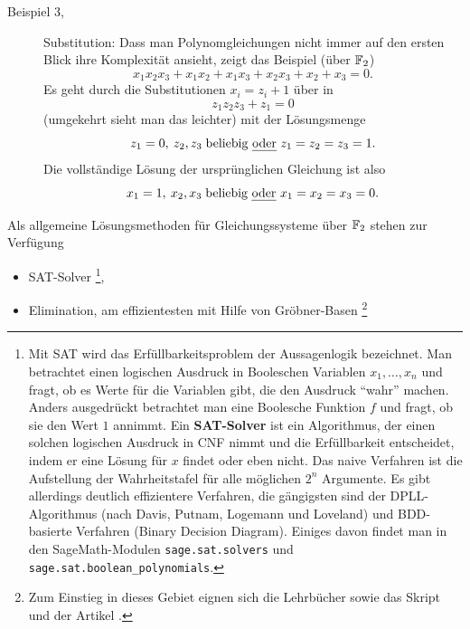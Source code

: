 \begin{refsegment}
\begin{description}
\item[Beispiel 3,] Substitution: Dass man
   Polynomgleichungen nicht immer auf den ersten
   Blick ihre Komplexität ansieht, zeigt das Beispiel (über $\mathbb{F}_2$)
\[
    x_1x_2x_3 + x_1x_2 + x_1x_3 + x_2x_3 + x_2 + x_3 = 0.
\]
   Es geht durch die Substitutionen $x_i = z_i + 1$ über in
\[
   z_1z_2z_3 + z_1 = 0
\]
   (umgekehrt sieht man das leichter) mit der Lösungsmenge
\[
   z_1 = 0,\: z_2, z_3 \;\text{beliebig {\em oder} } z_1 = z_2 = z_3 = 1.
\]
   Die vollständige Lösung der ursprünglichen Gleichung ist also
\[
   x_1 = 1,\: x_2, x_3 \;\text{beliebig {\em oder} } x_1 = x_2 = x_3 = 0.
\]
\end{description}

Als allgemeine Lösungsmethoden für Gleichungssysteme über $\mathbb{F}_2$
stehen zur Verfügung
\begin{itemize}
   \item SAT-Solver \cite{GaJo1979}\footnote{%
      Mit SAT wird das Erfüllbarkeitsproblem
      der Aussagenlogik bezeichnet.
      Man betrachtet einen logischen Ausdruck in Booleschen Variablen
      $x_1, \ldots, x_n$ und fragt, ob es Werte für die Variablen gibt,
      die den Ausdruck "`wahr"' machen. Anders ausgedrückt betrachtet
      man eine Boolesche Funktion
      $f$ und fragt, ob sie den Wert $1$ annimmt.
      Ein \textbf{SAT-Solver} ist ein Algorithmus, der einen solchen logischen
      Ausdruck in
      CNF nimmt und die Erfüllbarkeit entscheidet, indem er
      eine Lösung für $x$ findet oder eben nicht. Das naive
      Verfahren ist die Aufstellung der Wahrheitstafel
      für alle möglichen $2^n$ Argumente. Es gibt allerdings deutlich
      effizientere Verfahren, die gängigsten sind der
      DPLL-Algorithmus (nach Davis, Putnam, Logemann
      und Loveland) und BDD-basierte Verfahren (Binary Decision Diagram).
      Einiges davon findet man in den SageMath-Modulen {\tt sage.sat.solvers}
      und {\tt sage.sat.boolean\_polynomials}.
      },
   \item Elimination, am effizientesten mit Hilfe von
      Gröbner-Basen \cite{Bric2010}\footnote{%
      Zum Einstieg in dieses Gebiet eignen sich die Lehrbücher
      \cite{Bard2009,CLOS2007,GaGe1999} sowie das Skript \cite{Sege2004} und der
      Artikel \cite{Laza1983}.
}
\end{itemize}
\end{refsegment}
